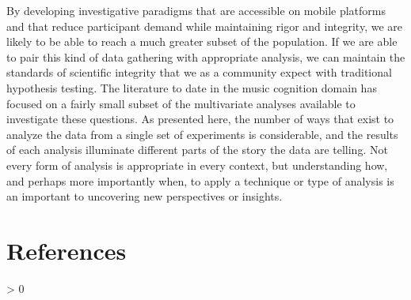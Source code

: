 \documentclass[
  english,
  man,floatsintext]{apa6}
\newlength{\cslhangindent}
\newenvironment{CSLReferences}[2] %
 {%
  \setlength{\parindent}{0pt}
  \ifodd #1 \everypar{\setlength{\hangindent}{\cslhangindent}}\ignorespaces\fi
  \ifnum #2 > 0
  \setlength{\parskip}{#2\baselineskip}
  \fi
 }%
 {}
\begin{document}
By developing investigative paradigms that are accessible on mobile platforms and that reduce participant demand while maintaining rigor and integrity, we are likely to be able to reach a much greater subset of the population. If we are able to pair this kind of data gathering with appropriate analysis, we can maintain the standards of scientific integrity that we as a community expect with traditional hypothesis testing. The literature to date in the music cognition domain has focused on a fairly small subset of the multivariate analyses available to investigate these questions. As presented here, the number of ways that exist to analyze the data from a single set of experiments is considerable, and the results of each analysis illuminate different parts of the story the data are telling. Not every form of analysis is appropriate in every context, but understanding how, and perhaps more importantly when, to apply a technique or type of analysis is an important to uncovering new perspectives or insights.

\newpage

\hypertarget{references}{%
\section{References}\label{references}}

\begingroup
\setlength{\parindent}{-0.5in}
\setlength{\leftskip}{0.5in}

\hypertarget{refs}{}
\begin{CSLReferences}{0}{0}
\end{CSLReferences}

\endgroup
\end{document}
